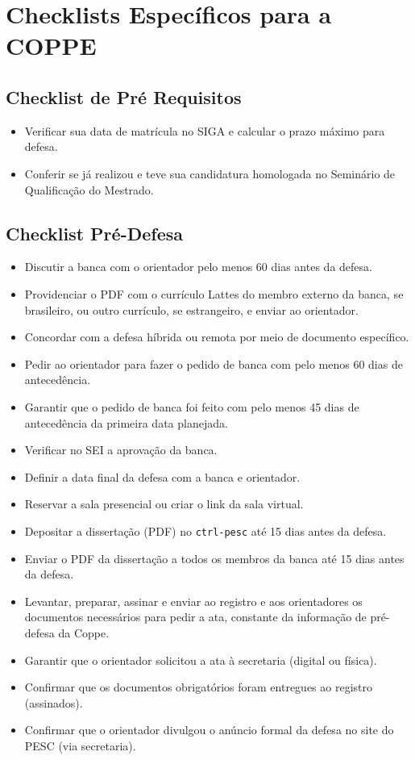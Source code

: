 \chapter{Checklists Específicos para a COPPE}


\section{Checklist de Pré Requisitos}

\begin{itemize}[label=\(\square\),leftmargin=2em,nosep]
    \item  Verificar sua data de matrícula no SIGA e calcular o prazo máximo para defesa.
    \item  Conferir se já realizou e teve sua candidatura homologada no Seminário de Qualificação do Mestrado.
\end{itemize}


\section{Checklist Pré-Defesa}

\begin{itemize}[label=\(\square\),leftmargin=2em,nosep]
    \item  Discutir a banca com o orientador pelo menos 60 dias antes da defesa.
    \item  Providenciar o PDF com o currículo Lattes do membro externo da banca, se brasileiro, ou outro currículo, se estrangeiro, e enviar ao orientador.
    \item  Concordar com a defesa híbrida ou remota por meio de documento específico.
    \item  Pedir ao orientador para fazer o pedido de banca com pelo menos 60 dias de antecedência.
    \item  Garantir que o pedido de banca foi feito com pelo menos 45 dias de antecedência da primeira data planejada.
    \item  Verificar no SEI a aprovação da banca.
    \item  Definir a data final da defesa com a banca e orientador.
    \item  Reservar a sala presencial ou criar o link da sala virtual.
    \item  Depositar a dissertação (PDF) no \verb|ctrl-pesc| até 15 dias antes da defesa.
    \item  Enviar o PDF da dissertação a todos os membros da banca até 15 dias antes da defesa.
    \item  Levantar, preparar, assinar e enviar ao registro e aos orientadores os documentos necessários para pedir a ata, constante da informação de pré-defesa da Coppe.
    \item  Garantir que o orientador solicitou a ata à secretaria (digital ou física).
    \item  Confirmar que os documentos obrigatórios foram entregues ao registro (assinados).
    \item  Confirmar que o orientador divulgou o anúncio formal da defesa no site do PESC (via secretaria).
    
\end{itemize}

